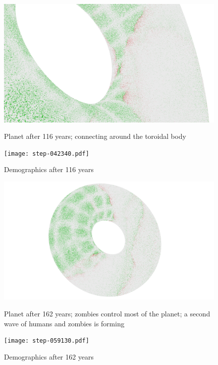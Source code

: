 \documentclass[a4paper]{article}
\begin{document}
\begin{figure}[pht]
    \centering
    \includegraphics[width=\textwidth]{torus/step-042340-torus.png}
    \caption{Planet after 116 years; connecting around the toroidal body}
    \texttt{[image: step-042340.pdf]}
    \caption{Demographics after 116 years}
\end{figure}

\begin{figure}[pht]
    \centering
    \includegraphics[width=\textwidth]{torus/step-059130-torus.png}
    \caption{Planet after 162 years; zombies control most of the planet; a second wave of humans and zombies is forming}
    \texttt{[image: step-059130.pdf]}
    \caption{Demographics after 162 years}
\end{figure}
\end{document}
